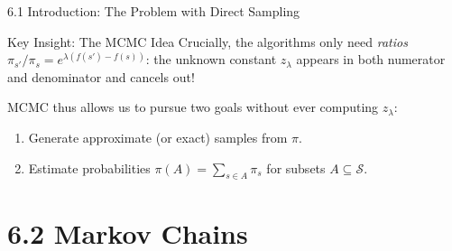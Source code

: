 \documentclass[aspectratio=169,10pt]{beamer}
\begin{document}
\begin{frame}[allowframebreaks]{6.1 Introduction: The Problem with Direct Sampling}
\begin{alertblock}{Key Insight: The MCMC Idea}
Crucially, the algorithms only need \emph{ratios} $\pi_{s'}/\pi_s = e^{\lambda(f(s')-f(s))}$: the unknown constant $z_\lambda$ appears in both numerator and denominator and cancels out!
\end{alertblock}

MCMC thus allows us to pursue two goals without ever computing $z_\lambda$:
\begin{enumerate}
  \item[(A1)] Generate approximate (or exact) samples from $\pi$.
  \item[(A2)] Estimate probabilities $\pi(A) = \sum_{s \in A} \pi_s$ for subsets $A \subseteq \mathcal{S}$.
\end{enumerate}

\end{frame}

\section{6.2 Markov Chains}
\end{document}
